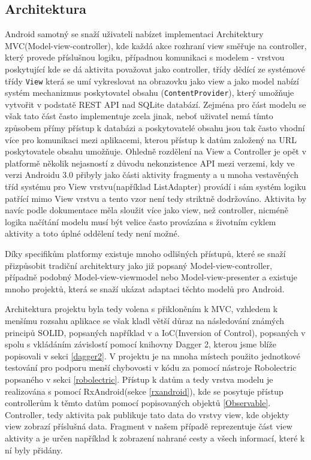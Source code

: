 \documentclass{article}
\begin{document}
\subsection{Architektura}
Android samotný se snaží uživateli nabízet implementaci Architektury MVC(Model-view-controller), kde
každá akce rozhraní view směřuje na controller, který provede příslušnou logiku, případnou komunikaci
s modelem - vrstvou poskytující
kde se dá aktivita považovat jako controller, třídy dědící ze systémové třídy \texttt{View} která
se umí vykreslovat na obrazovku jako view a jako model nabízí systém mechanizmus poskytovatel obsahu
(\texttt{ContentProvider}), který umožňuje vytvořit v podstatě REST API nad SQLite databází.
Zejména pro část modelu se však tato část často implementuje zcela jinak, neboť uživatel nemá tímto způsobem
přímy přístup k databázi a poskytovatelé obsahu jsou tak často vhodní více pro komunikaci mezi aplikacemi,
kterou přístup k datům založený na URL poskytovatele obsahu umožňuje. Ohledně rozdělení na View a Controller je opět
v platformě několik nejasností z důvodu nekonzistence API mezi verzemi, kdy ve verzi Androidu 3.0 přibyly
jako části aktivity fragmenty a u mnoha vestavěných tříd systému pro View vrstvu(například ListAdapter)
provádí i sám systém logiku patřící mimo View vrstvu a tento vzor není tedy striktně dodržováno.
Aktivita by navíc podle dokumentace měla sloužit více jako view, než controller, nicméně logika načítání
modelu musí být velice často provázána s životním cyklem aktivity a toto úplné oddělení tedy není možné.

Díky specifikům platformy existuje mnoho odlišných přístupů, které se snaží přizpůsobit
tradiční architektury jako již popsaný Model-view-controller, případně podobný Model-view-viewmodel
nebo Model-view-presenter a existuje mnoho projektů, která se snaží ukázat adaptaci těchto modelů
pro Android.

Architektura projektu byla tedy volena s přikloněním k MVC, vzhledem k menšímu rozsahu aplikace
se však kladl větší důraz na následování známých principů SOLID, popsaných
například v \cite{solid} a IoC(Inversion of Control), popsaných v \cite{ioc} spolu s vkládáním
závislostí pomocí knihovny Dagger 2, kterou jsme blíže popisovali v sekci \ref{dagger2}.
V projektu je na mnoha místech použito jednotkové testování pro podporu menší chybovosti v kódu
za pomocí nástroje Robolectric popsaného v sekci \ref{robolectric}. Přístup k datům a tedy
vrstva modelu je realizována s pomocí RxAndroid(sekce \ref{rxandroid}), kde se posytuje přístup
controllerům k těmto datům pomocí popisovaných objektů \ref{Observable}. Controller, tedy aktivita
pak publikuje tato data do vrstvy view, kde objekty view zobrazí příslušná data. Fragment v našem
případě reprezentuje část view aktivity a je určen například k zobrazení nahrané cesty a všech informací,
které k ní byly přidány.
\end{document}
